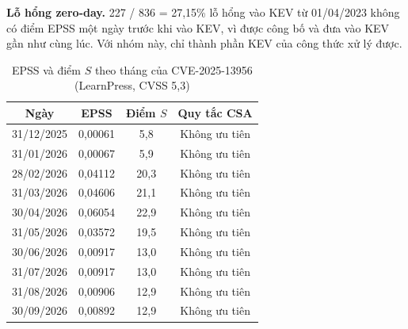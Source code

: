 \documentclass[conference]{IEEEtran}
\begin{document}
\textbf{Lỗ hổng zero-day.} 227 / 836 = 27,15\% lỗ hổng vào KEV từ 01/04/2023 không có điểm EPSS một ngày trước
khi vào KEV, vì được công bố và đưa vào KEV gần như cùng lúc. Với nhóm này, chỉ thành phần KEV của công thức xử lý được.

\begin{table}[t]
\centering
\caption{EPSS và điểm $S$ theo tháng của CVE-2025-13956 (LearnPress, CVSS 5,3)}\label{tab:crowdsec}
\footnotesize
\begin{tabular}{cccc}
\toprule
Ngày & EPSS & Điểm $S$ & Quy tắc CSA \\
\midrule
31/12/2025 & 0,00061 & 5,8 & Không ưu tiên \\
31/01/2026 & 0,00067 & 5,9 & Không ưu tiên \\
28/02/2026 & 0,04112 & 20,3 & Không ưu tiên \\
31/03/2026 & 0,04606 & 21,1 & Không ưu tiên \\
30/04/2026 & 0,06054 & 22,9 & Không ưu tiên \\
31/05/2026 & 0,03572 & 19,5 & Không ưu tiên \\
30/06/2026 & 0,00917 & 13,0 & Không ưu tiên \\
31/07/2026 & 0,00917 & 13,0 & Không ưu tiên \\
31/08/2026 & 0,00906 & 12,9 & Không ưu tiên \\
30/09/2026 & 0,00892 & 12,9 & Không ưu tiên \\
\bottomrule
\end{tabular}
\end{table}
\end{document}
